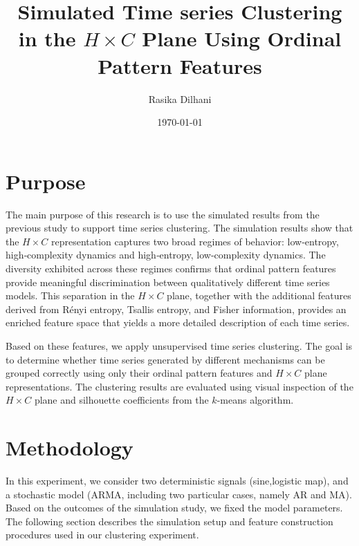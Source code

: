 \documentclass[12pt,a4paper]{article}
\title{Simulated Time series Clustering in the $H \times C$ Plane Using Ordinal Pattern Features}
\author{Rasika Dilhani}
\date{\today}
\begin{document}
	
	\maketitle
	
\section{Purpose}
\noindent
The main purpose of this research is to use the simulated results from the previous study to support time series clustering. The simulation results show that the $H \times C$ representation captures two broad regimes of behavior: low‑entropy, high‑complexity dynamics and high‑entropy, low‑complexity dynamics. The diversity exhibited across these regimes confirms that ordinal pattern features provide meaningful discrimination between qualitatively different time series models. This separation in the $H \times C$ plane, together with the additional features derived from R\'enyi entropy, Tsallis entropy, and Fisher information, provides an enriched feature space that yields a more detailed description of each time series.

\medskip

\noindent
Based on these features, we apply unsupervised time series clustering. The goal is to determine whether time series generated by different mechanisms can be grouped correctly using only their ordinal pattern features and $H \times C$ plane representations. The clustering results are evaluated using visual inspection of the $H \times C$ plane and silhouette coefficients from the $k$-means algorithm.

	
\section{Methodology}{\label{sec:methodolpgy}}


In this experiment, we consider two deterministic signals (sine,logistic map), and a stochastic model  (ARMA, including two particular cases, namely AR and MA). Based on the outcomes of the simulation study, we fixed the model parameters. The following section describes the simulation setup and feature construction procedures used in our clustering experiment.
\end{document}
